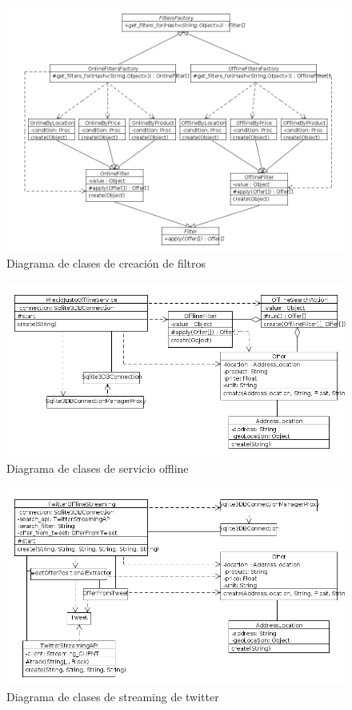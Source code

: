 \begin{figure}[ht]
\includegraphics[width=\textwidth]{./imgs/class_diagram_filters_factory.png}
\caption{Diagrama de clases de creación de filtros}
\end{figure}

\begin{figure}[ht]
\includegraphics[width=\textwidth]{./imgs/class_diagram_offline_service.png}
\caption{Diagrama de clases de servicio offline}
\end{figure}

\begin{figure}[ht]
\includegraphics[width=\textwidth]{./imgs/class_diagram_offline_streaming.png}
\caption{Diagrama de clases de streaming de twitter}
\end{figure}

